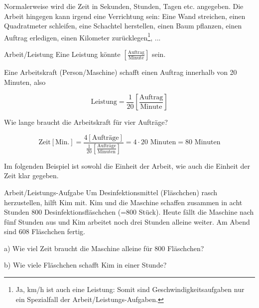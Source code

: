 Normalerweise wird die Zeit in Sekunden, Stunden, Tagen etc. angegeben. Die
Arbeit hingegen kann irgend eine Verrichtung sein: Eine Wand
streichen, einen Quadratmeter schleifen, eine Schachtel herstellen,
einen Baum pflanzen, einen Auftrag erledigen, einen Kilometer zurücklegen\footnote{Ja, km/h ist auch eine Leistung: Somit sind Geschwindigkeitsaufgaben nur ein Spezialfall der Arbeit/Leistungs-Aufgaben.}, ...

\begin{beispiel}{Arbeit/Leistung}{}
  Eine Leistung könnte  $\left[\frac{\text{Auftrag}}{\text{Minute}}\right]$ sein.

  Eine Arbeitskraft (Person/Maschine) schafft einen Auftrag innerhalb von 20 Minuten, also

  $$\text{Leistung} = \frac1{20} \left[\frac{\text{Auftrag}}{\text{Minute}}\right]$$

  Wie lange braucht die Arbeitskraft für vier Aufträge?

  $$\text{Zeit} [\text{Min.}] = \frac{4[\text{Aufträge}]}{\frac{1}{20} \left[\frac{\text{Aufträge}}{\text{Minuten}}\right]} = 4\cdot{} 20 \text{ Minuten} = 80 \text{ Minuten}$$
\end{beispiel}
\newpage

Im folgenden Beispiel ist sowohl die Einheit der Arbeit, wie auch die
Einheit der Zeit klar gegeben.

\begin{beispiel}{Arbeit/Leistungs-Aufgabe}{}
  Um Desinfektionsmittel (Fläschchen) rasch herzustellen, hilft Kim mit.
  Kim und die Maschine schaffen zusammen in acht Stunden 800
  Desinfektionsfläschchen (=800 Stück).
  Heute fällt die Maschine nach fünf Stunden aus und Kim arbeitet noch
  drei Stunden alleine weiter. Am Abend sind 608 Fläschchen fertig.

  a) Wie viel Zeit braucht die Maschine alleine für 800 Fläschchen?

  b) Wie viele Fläschchen schafft Kim in einer Stunde?
\end{beispiel}

